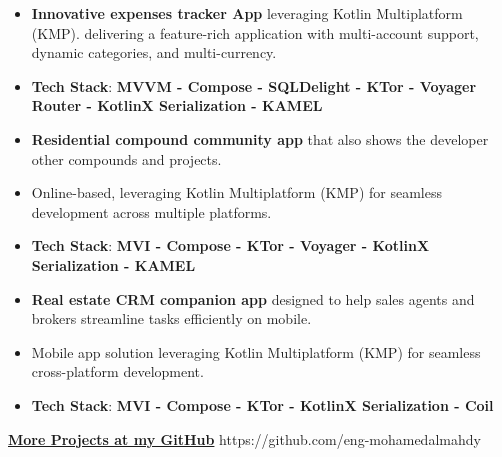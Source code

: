 \documentclass[10pt,a4paper,ragged2e,withhyper]{altacv}
\begin{document}
\vspace{6px}
\vspace{2px}

\begin{itemize}
\item \textbf{Innovative expenses tracker App}  leveraging Kotlin Multiplatform (KMP).
\linebreak delivering a feature-rich application with multi-account support, dynamic categories, and multi-currency.
\item \textbf{Tech Stack}: \textbf{MVVM - Compose - SQLDelight - KTor - Voyager Router - KotlinX Serialization - KAMEL}
\end{itemize}
\divider


\hypertarget{ion}{}
\begin{itemize}
\item \textbf{Residential compound community app} that also shows the developer other compounds and projects.
\item Online-based, leveraging Kotlin Multiplatform (KMP) for seamless development across multiple platforms.
\item \textbf{Tech Stack}: \textbf{MVI - Compose - KTor - Voyager - KotlinX Serialization - KAMEL}
\end{itemize}
\divider

\hypertarget{ures}{}

\begin{itemize}
\item \textbf{Real estate CRM companion app} designed to help sales agents and brokers streamline tasks efficiently on mobile.
\item Mobile app solution leveraging Kotlin Multiplatform (KMP) for seamless cross-platform development.
\item \textbf{Tech Stack}: \textbf{MVI - Compose - KTor - KotlinX Serialization - Coil}
\end{itemize}
\divider

\begin{center}
\textbf{\Large \href{https://github.com/eng-mohamedalmahdy}{More Projects at my GitHub}}
{\cvrepo{\color{GitHubColor}\faGithub}
{https://github.com/eng-mohamedalmahdy}}{}{}
\end{center}
\divider
\end{document}
